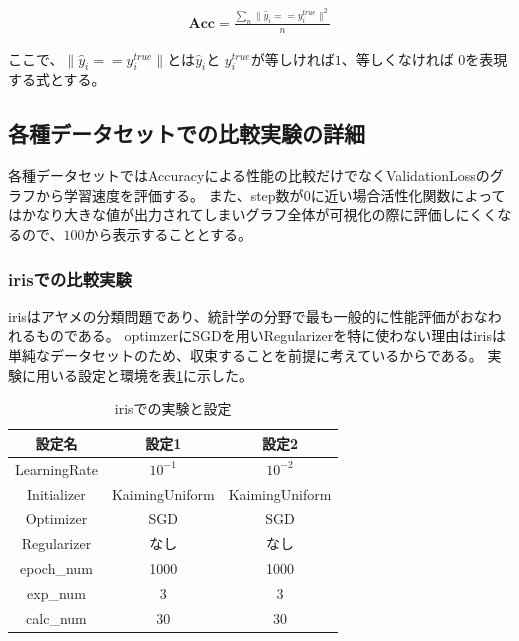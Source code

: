 \begin{eqnarray}
\mathbf{Acc} = \frac{\sum_n \| \hat{y}_i == y_i^{true}\|^2}{n}
\label{eq:accuracy}
\end{eqnarray}

ここで、$ \| \hat{y}_i == y_i^{true}\| $とは$ \hat{y}_i $と $ y_i^{true} $が等しければ$ 1 $、等しくなければ $ 0 $を表現する式とする。

\subsection{各種データセットでの比較実験の詳細}

各種データセットではAccuracyによる性能の比較だけでなくValidationLossのグラフから学習速度を評価する。
また、step数が$0$に近い場合活性化関数によってはかなり大きな値が出力されてしまいグラフ全体が可視化の際に評価しにくくなるので、$100$から表示することとする。

\subsubsection{irisでの比較実験}
\label{impl:iris}

irisはアヤメの分類問題であり、統計学の分野で最も一般的に性能評価がおなわれるものである。
optimzerにSGDを用いRegularizerを特に使わない理由はirisは単純なデータセットのため、収束することを前提に考えているからである。
実験に用いる設定と環境を表\ref{exp:iris}に示した。


\begin{table}[htbp]
\label{exp:iris}
    \begin{center}
        \caption{irisでの実験と設定}
        \label{exp:iris}
        \vspace{2mm} 
        \begin{tabular}{ |c|c|c| }
        \hline
        設定名 & 設定1 & 設定2 \\
        \hline
        LearningRate         & $ 10^{-1} $ & $ 10^{-2} $ \\
        \hline
        Initializer       & KaimingUniform &  KaimingUniform \\
        \hline
        Optimizer           & SGD & SGD \\
        \hline
        Regularizer     & なし & なし \\
        \hline
        epoch\_num       & 1000 &  1000 \\
        \hline
        exp\_num         & 3 & 3 \\
        \hline
        calc\_num        & 30 & 30 \\
        \hline
        \end{tabular}
    \end{center}
\end{table}



